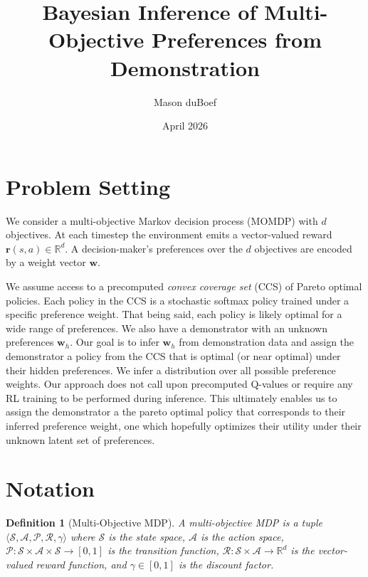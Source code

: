 \documentclass[11pt]{article}
\title{Bayesian Inference of Multi-Objective Preferences from Demonstration\\}
\author{Mason duBoef}
\date{April 2026}
\newtheorem{definition}{Definition}
\begin{document}
\maketitle

\section{Problem Setting}

We consider a multi-objective Markov decision process (MOMDP) with $d$ objectives. At each timestep the environment emits a vector-valued reward $\mathbf{r}(s,a) \in \mathbb{R}^d$. A decision-maker's preferences over the $d$ objectives are encoded by a weight vector $\mathbf{w}$.

We assume access to a precomputed \emph{convex coverage set} (CCS) of Pareto optimal policies. Each policy in the CCS is a stochastic softmax policy trained under a specific preference weight. That being said, each policy is likely optimal for a wide range of preferences. We also have a demonstrator with an unknown preferences $\mathbf{w}_h$. Our goal is to infer $\mathbf{w}_h$ from demonstration data and assign the demonstrator a policy from the CCS that is optimal (or near optimal) under their hidden preferences. We infer a distribution over all possible preference weights. Our approach does not call upon precomputed Q-values or require any RL training to be performed during inference. This ultimately enables us to assign the demonstrator a the pareto optimal policy that corresponds to their inferred preference weight, one which hopefully optimizes their utility under their unknown latent set of preferences.

\section{Notation}

\begin{definition}[Multi-Objective MDP]
A multi-objective MDP is a tuple $\langle \mathcal{S}, \mathcal{A}, \mathcal{P}, \bm{\mathcal{R}}, \gamma \rangle$ where $\mathcal{S}$ is the state space, $\mathcal{A}$ is the action space, $\mathcal{P}: \mathcal{S} \times \mathcal{A} \times \mathcal{S} \to [0,1]$ is the transition function, $\bm{\mathcal{R}}: \mathcal{S} \times \mathcal{A} \to \mathbb{R}^d$ is the vector-valued reward function, and $\gamma \in [0,1]$ is the discount factor.
\end{definition}
\end{document}
